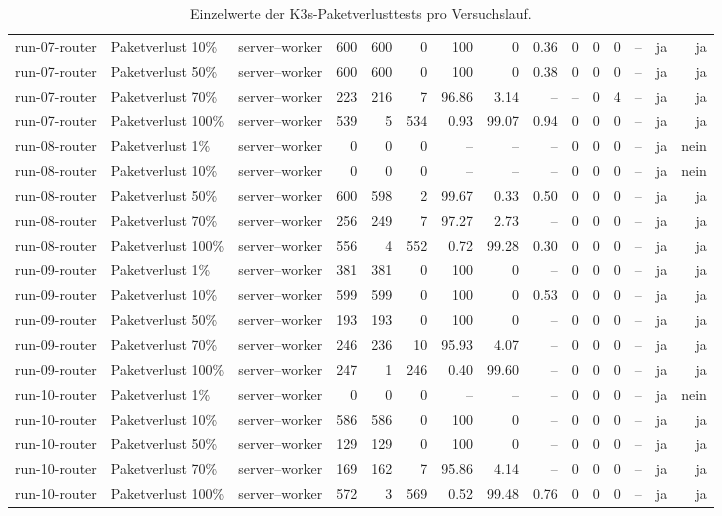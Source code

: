 \begin{table}
{\begin{tabular}{l l p{3.2cm} r r r r r r r r r r r r}
run-07-router & Paketverlust 10\% & server--worker & 600 & 600 & 0 & 100 & 0 & 0.36 & 0 & 0 & 0 & -- & ja & ja \\
run-07-router & Paketverlust 50\% & server--worker & 600 & 600 & 0 & 100 & 0 & 0.38 & 0 & 0 & 0 & -- & ja & ja \\
run-07-router & Paketverlust 70\% & server--worker & 223 & 216 & 7 & 96.86 & 3.14 & -- & -- & 0 & 4 & -- & ja & ja \\
run-07-router & Paketverlust 100\% & server--worker & 539 & 5 & 534 & 0.93 & 99.07 & 0.94 & 0 & 0 & 0 & -- & ja & ja \\
run-08-router & Paketverlust 1\% & server--worker & 0 & 0 & 0 & -- & -- & -- & 0 & 0 & 0 & -- & ja & nein \\
run-08-router & Paketverlust 10\% & server--worker & 0 & 0 & 0 & -- & -- & -- & 0 & 0 & 0 & -- & ja & nein \\
run-08-router & Paketverlust 50\% & server--worker & 600 & 598 & 2 & 99.67 & 0.33 & 0.50 & 0 & 0 & 0 & -- & ja & ja \\
run-08-router & Paketverlust 70\% & server--worker & 256 & 249 & 7 & 97.27 & 2.73 & -- & 0 & 0 & 0 & -- & ja & ja \\
run-08-router & Paketverlust 100\% & server--worker & 556 & 4 & 552 & 0.72 & 99.28 & 0.30 & 0 & 0 & 0 & -- & ja & ja \\
run-09-router & Paketverlust 1\% & server--worker & 381 & 381 & 0 & 100 & 0 & -- & 0 & 0 & 0 & -- & ja & ja \\
run-09-router & Paketverlust 10\% & server--worker & 599 & 599 & 0 & 100 & 0 & 0.53 & 0 & 0 & 0 & -- & ja & ja \\
run-09-router & Paketverlust 50\% & server--worker & 193 & 193 & 0 & 100 & 0 & -- & 0 & 0 & 0 & -- & ja & ja \\
run-09-router & Paketverlust 70\% & server--worker & 246 & 236 & 10 & 95.93 & 4.07 & -- & 0 & 0 & 0 & -- & ja & ja \\
run-09-router & Paketverlust 100\% & server--worker & 247 & 1 & 246 & 0.40 & 99.60 & -- & 0 & 0 & 0 & -- & ja & ja \\
run-10-router & Paketverlust 1\% & server--worker & 0 & 0 & 0 & -- & -- & -- & 0 & 0 & 0 & -- & ja & nein \\
run-10-router & Paketverlust 10\% & server--worker & 586 & 586 & 0 & 100 & 0 & -- & 0 & 0 & 0 & -- & ja & ja \\
run-10-router & Paketverlust 50\% & server--worker & 129 & 129 & 0 & 100 & 0 & -- & 0 & 0 & 0 & -- & ja & ja \\
run-10-router & Paketverlust 70\% & server--worker & 169 & 162 & 7 & 95.86 & 4.14 & -- & 0 & 0 & 0 & -- & ja & ja \\
run-10-router & Paketverlust 100\% & server--worker & 572 & 3 & 569 & 0.52 & 99.48 & 0.76 & 0 & 0 & 0 & -- & ja & ja \\
\bottomrule
\end{tabular}%
}
\caption{Einzelwerte der K3s-Paketverlusttests pro Versuchslauf.}
\label{tab:appendix-k3s-packet-loss-runs}
\end{table}
